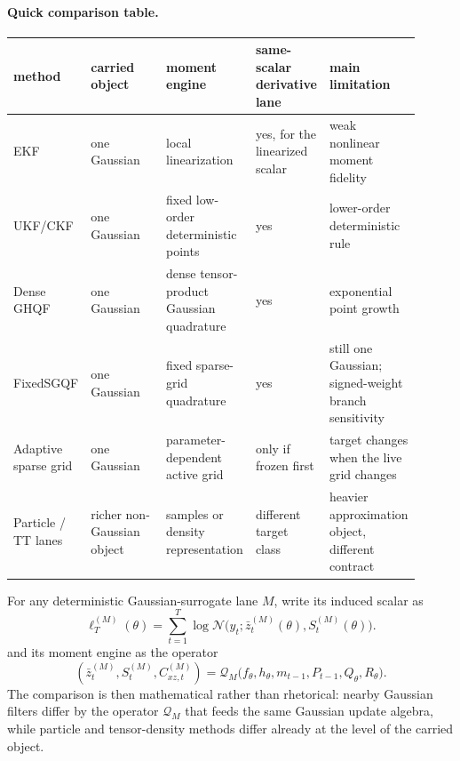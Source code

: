 \documentclass[11pt]{article}
\numberwithin{equation}{section}
\begin{document}
\paragraph{Quick comparison table.}
\begin{center}
\small
\begin{tabular}{p{0.16\linewidth}p{0.19\linewidth}p{0.19\linewidth}p{0.17\linewidth}p{0.20\linewidth}}
\toprule
method & carried object & moment engine & same-scalar derivative lane & main limitation \\
\midrule
EKF & one Gaussian & local linearization & yes, for the linearized scalar & weak nonlinear moment fidelity \\
UKF/CKF & one Gaussian & fixed low-order deterministic points & yes & lower-order deterministic rule \\
Dense GHQF & one Gaussian & dense tensor-product Gaussian quadrature & yes & exponential point growth \\
FixedSGQF & one Gaussian & fixed sparse-grid quadrature & yes & still one Gaussian; signed-weight branch sensitivity \\
Adaptive sparse grid & one Gaussian & parameter-dependent active grid & only if frozen first & target changes when the live grid changes \\
Particle / TT lanes & richer non-Gaussian object & samples or density representation & different target class & heavier approximation object, different contract \\
\bottomrule
\end{tabular}
\end{center}

For any deterministic Gaussian-surrogate lane \(M\), write its induced scalar as
\begin{equation}
  \ell_T^{(M)}(\theta)
  =
  \sum_{t=1}^T
  \log \mathcal N\bigl(y_t;\bar z_t^{(M)}(\theta),S_t^{(M)}(\theta)\bigr).
  \label{eq:p32-selection-generic-scalar}
\end{equation}
and its moment engine as the operator
\begin{equation}
  (\bar z_t^{(M)},S_t^{(M)},C_{xz,t}^{(M)})
  =
  \mathcal Q_M\bigl(f_\theta,h_\theta,m_{t-1},P_{t-1},Q_\theta,R_\theta\bigr).
  \label{eq:p32-selection-generic-operator}
\end{equation}
The comparison is then mathematical rather than rhetorical: nearby Gaussian
filters differ by the operator \(\mathcal Q_M\) that feeds the same Gaussian
update algebra, while particle and tensor-density methods differ already at the
level of the carried object.
\end{document}
